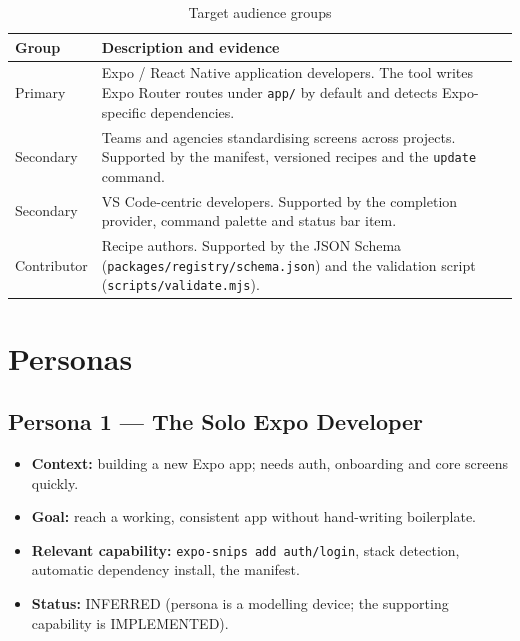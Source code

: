 \begin{longtable}{p{3.6cm}p{10.8cm}}
\caption{Target audience groups}\\
\toprule
\textbf{Group} & \textbf{Description and evidence} \\
\midrule

Primary & Expo / React Native application developers. The tool writes Expo Router
          routes under \texttt{app/} by default and detects Expo-specific
          dependencies. \\
Secondary & Teams and agencies standardising screens across projects. Supported by
            the manifest, versioned recipes and the \texttt{update} command. \\
Secondary & VS Code-centric developers. Supported by the completion provider,
            command palette and status bar item. \\
Contributor & Recipe authors. Supported by the JSON Schema
              (\texttt{packages/registry/schema.json}) and the validation script
              (\texttt{scripts/validate.mjs}). \\
\bottomrule
\end{longtable}

\section{Personas}

\subsection*{Persona 1 --- The Solo Expo Developer}
\begin{itemize}
  \item \textbf{Context:} building a new Expo app; needs auth, onboarding and core
        screens quickly.
  \item \textbf{Goal:} reach a working, consistent app without hand-writing
        boilerplate.
  \item \textbf{Relevant capability:} \texttt{expo-snips add auth/login}, stack
        detection, automatic dependency install, the manifest.
  \item \textbf{Status:} INFERRED (persona is a modelling device; the supporting
        capability is IMPLEMENTED).
\end{itemize}

